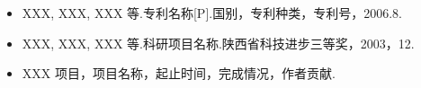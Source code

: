 \begin{itemize}
\item XXX, XXX, XXX 等.专利名称[P].国别，专利种类，专利号，2006.8.
\item XXX, XXX, XXX 等.科研项目名称.陕西省科技进步三等奖，2003，12.
\item XXX 项目，项目名称，起止时间，完成情况，作者贡献.
\end{itemize}

